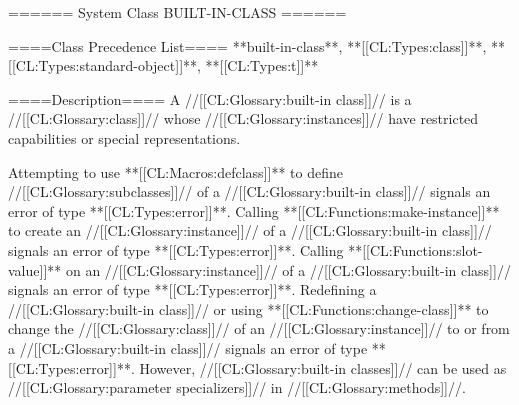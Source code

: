 ====== System Class BUILT-IN-CLASS ======

====Class Precedence List==== 
**built-in-class**, **[[CL:Types:class]]**, **[[CL:Types:standard-object]]**, **[[CL:Types:t]]**

====Description====
A //[[CL:Glossary:built-in class]]// is a //[[CL:Glossary:class]]// whose //[[CL:Glossary:instances]]// have restricted capabilities or special representations.

Attempting to use **[[CL:Macros:defclass]]** to define //[[CL:Glossary:subclasses]]// of a //[[CL:Glossary:built-in class]]// signals an error of type **[[CL:Types:error]]**. Calling **[[CL:Functions:make-instance]]** to create an //[[CL:Glossary:instance]]// of a //[[CL:Glossary:built-in class]]// signals an error of type **[[CL:Types:error]]**. Calling **[[CL:Functions:slot-value]]** on an //[[CL:Glossary:instance]]// of a //[[CL:Glossary:built-in class]]// signals an error of type **[[CL:Types:error]]**. Redefining a //[[CL:Glossary:built-in class]]// or using **[[CL:Functions:change-class]]** to change the //[[CL:Glossary:class]]// of an //[[CL:Glossary:instance]]// to or from a //[[CL:Glossary:built-in class]]// signals an error of type **[[CL:Types:error]]**. However, //[[CL:Glossary:built-in classes]]// can be used as //[[CL:Glossary:parameter specializers]]// in //[[CL:Glossary:methods]]//.

